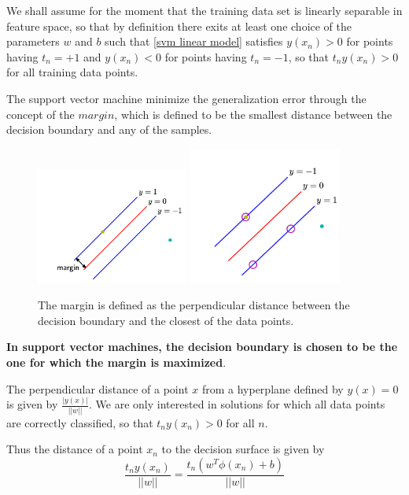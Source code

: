 We shall assume for the moment that the training data set is linearly separable in feature space, so that by definition there exits at least one choice of the parameters $w$ and $b$ such that \ref{svm linear model} satisfies $y(x_n) > 0$ for points having $t_n = +1$ and $y(x_n) < 0$ for points having $t_n=-1$, so that $t_ny(x_n) > 0$ for all training data points.

The support vector machine minimize the generalization error through the concept of the $margin$, which is defined to be the smallest distance between the decision boundary and any of the samples.

\begin{figure}
    \centering
    \subfloat
        \centering
        \includegraphics[width=5cm]{chapter005/figures/fig001}
    \qquad
    \subfloat
        \centering
            \includegraphics[width=5cm]{chapter005/figures/fig002}
    \label{fig:example}
    \caption{The margin is defined as the perpendicular distance between the decision boundary and the closest of the data points.}
\end{figure}

\textbf{In support vector machines, the decision boundary is chosen to be the one for which the margin is maximized}.

The perpendicular distance of a point $x$ from a hyperplane defined by $y(x)=0$ is given by $\frac{|y(x)|}{||w||}$.
We are only interested in solutions for which all data points are correctly classified, so that $t_ny(x_n)>0$ for all $n$.

Thus the distance of a point $x_n$ to the decision surface is given by
\begin{equation}
    \frac{t_ny(x_n)}{||w||} = \frac{t_n(w^T\phi(x_n) + b)}{||w||}
\end{equation}


